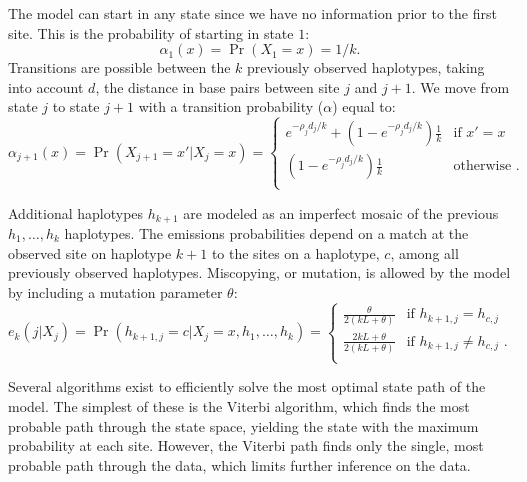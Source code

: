 The model can start in any state since we have no information prior to the first site.
This is the probability of starting in state $1$:
\begin{equation}
    \alpha_1(x) = \Pr( X_1 = x ) = 1 / k .
\end{equation}
%
Transitions are possible between the $k$ previously observed haplotypes, taking into account $d$, the distance in base pairs between site $j$ and $j+1$.
We move from state $j$ to state $j+1$ with a transition probability ($\alpha$) equal to:
\begin{equation}
    \alpha_{j+1}(x) = \Pr( X_{j+1} = x' | X_j = x ) = 
    \begin{cases}
        e^{-\rho_j d_j / k} + ( 1- e^{-\rho_j d_j / k} ) \frac{1}{k}
        &  \text{if $x' = x$ } \\
        ( 1- e^{-\rho_j d_j / k} ) \frac{1}{k}
        &  \text{otherwise .} \\
    \end{cases}
\end{equation}

Additional haplotypes $h_{k+1}$ are modeled as an imperfect mosaic of the previous $h_1,\dots,h_k$ haplotypes.
The emissions probabilities depend on a match at the observed site on haplotype $k+1$ to the sites on a haplotype, $c$, among all previously observed haplotypes.
Miscopying, or mutation, is allowed by the model by including a mutation parameter $\theta$:
\begin{equation}
    e_k(j|X_j) = 
    \Pr( h_{k+1,j} = c | X_j = x , h_1,\dots,h_k ) = 
    \begin{cases}
        \frac{ \theta }{ 2(kL+\theta) }
        & \text{if $h_{k+1,j} = h_{c,j}$} \\
        \frac{ 2kL+\theta }{ 2(kL+\theta) }
        & \text{if $h_{k+1,j} \ne h_{c,j}$ .} \\
    \end{cases}
\end{equation}






Several algorithms exist to efficiently solve the most optimal state path of the model.
The simplest of these is the Viterbi algorithm, which finds the most probable path through the state space, yielding the state with the maximum probability at each site.
However, the Viterbi path finds only the single, most probable path through the data, which limits further inference on the data.

